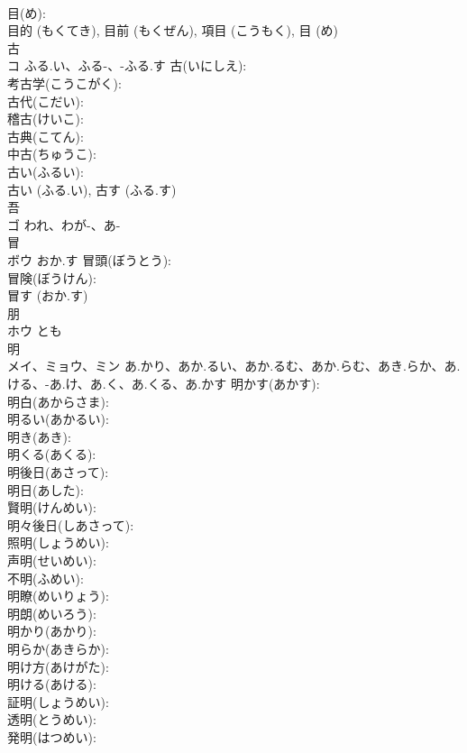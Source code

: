 \documentclass[8pt]{extreport}
\begin{document}
\begin{CJK}{UTF8}{min}
\\	目(め): 
\\	目的 (もくてき), 目前 (もくぜん), 項目 (こうもく), 目 (め)
\\	古			
\\	コ	ふる.い、ふる-、-ふる.す	古(いにしえ): 
\\	考古学(こうこがく): 
\\	古代(こだい): 
\\	稽古(けいこ): 
\\	古典(こてん): 
\\	中古(ちゅうこ): 
\\	古い(ふるい): 
\\	古い (ふる.い), 古す (ふる.す)
\\	吾			
\\	ゴ	われ、わが-、あ-		
\\	冒			
\\	ボウ	おか.す	冒頭(ぼうとう): 
\\	冒険(ぼうけん): 
\\	冒す (おか.す)
\\	朋			
\\	ホウ	とも		
\\	明			
\\	メイ、ミョウ、ミン	あ.かり、あか.るい、あか.るむ、あか.らむ、あき.らか、あ.ける、-あ.け、あ.く、あ.くる、あ.かす	明かす(あかす): 
\\	明白(あからさま): 
\\	明るい(あかるい): 
\\	明き(あき): 
\\	明くる(あくる): 
\\	明後日(あさって): 
\\	明日(あした): 
\\	賢明(けんめい): 
\\	明々後日(しあさって): 
\\	照明(しょうめい): 
\\	声明(せいめい): 
\\	不明(ふめい): 
\\	明瞭(めいりょう): 
\\	明朗(めいろう): 
\\	明かり(あかり): 
\\	明らか(あきらか): 
\\	明け方(あけがた): 
\\	明ける(あける): 
\\	証明(しょうめい): 
\\	透明(とうめい): 
\\	発明(はつめい): 

\end{CJK}
\end{document}
